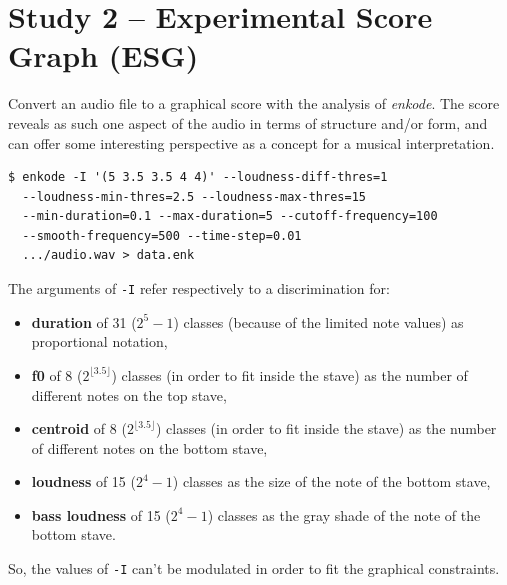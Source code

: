 \bigskip


\section*{Study 2 -- Experimental Score Graph (ESG)}



Convert an audio file to a graphical score with the analysis of \textsl{enkode}. The score reveals as such one aspect of the audio in terms of structure and/or form, and can offer some interesting perspective as a concept for a musical interpretation.

\bigskip

\begin{lstlisting}
$ enkode -I '(5 3.5 3.5 4 4)' --loudness-diff-thres=1 
  --loudness-min-thres=2.5 --loudness-max-thres=15 
  --min-duration=0.1 --max-duration=5 --cutoff-frequency=100 
  --smooth-frequency=500 --time-step=0.01 
  .../audio.wav > data.enk
\end{lstlisting}

The arguments of \texttt{-I} refer respectively to a discrimination for:

\begin{itemize}
\item \textbf{duration} of 31 ($2^5 -1$) classes (because of the limited note values) as proportional notation, 
\item \textbf{f0} of 8 ($2^{\lfloor 3.5 \rfloor}$) classes (in order to fit inside the stave) as the number of different notes on the top stave,
\item \textbf{centroid} of 8 ($2^{\lfloor 3.5 \rfloor}$) classes (in order to fit inside the stave) as the number of different notes on the bottom stave,
\item \textbf{loudness} of 15 ($2^4 -1$) classes as the size of the note of the bottom stave,
\item \textbf{bass loudness} of 15 ($2^4 -1$) classes as the gray shade of the note of the bottom stave.
\end{itemize}
 
 \noindent
\begin{info}
\begin{minipage}{0.95\textwidth}
\vspace{0.2cm}
 So, the values of \texttt{-I} can't be modulated in order to fit the graphical constraints.
\vspace{0.2cm}
\end{minipage}
\end{info}

